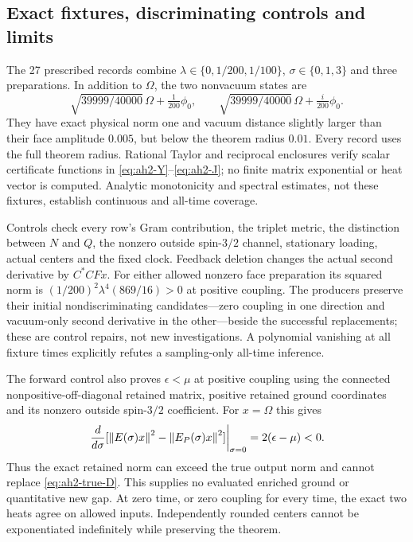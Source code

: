 \subsection{Exact fixtures, discriminating controls and limits}
The 27 prescribed records combine $\lambda\in\{0,1/200,1/100\}$, $\sigma\in\{0,1,3\}$ and three preparations. In addition to $\Omega$, the two nonvacuum states are
\begin{equation}
 \sqrt{39999/40000}\,\Omega+\tfrac1{200}\phi_0,
 \qquad
 \sqrt{39999/40000}\,\Omega+\tfrac{i}{200}\phi_0.
\end{equation}
They have exact physical norm one and vacuum distance slightly larger than their face amplitude $0.005$, but below the theorem radius $0.01$. Every record uses the full theorem radius. Rational Taylor and reciprocal enclosures verify scalar certificate functions in \eqref{eq:ah2-Y}--\eqref{eq:ah2-J}; no finite matrix exponential or heat vector is computed. Analytic monotonicity and spectral estimates, not these fixtures, establish continuous and all-time coverage.

Controls check every row's Gram contribution, the triplet metric, the distinction between $N$ and $Q$, the nonzero outside spin-$3/2$ channel, stationary loading, actual centers and the fixed clock. Feedback deletion changes the actual second derivative by $C^*CFx$. For either allowed nonzero face preparation its squared norm is $(1/200)^2\lambda^4(869/16)>0$ at positive coupling. The producers preserve their initial nondiscriminating candidates---zero coupling in one direction and vacuum-only second derivative in the other---beside the successful replacements; these are control repairs, not new investigations. A polynomial vanishing at all fixture times explicitly refutes a sampling-only all-time inference.

The forward control also proves $\epsilon<\mu$ at positive coupling using the connected nonpositive-off-diagonal retained matrix, positive retained ground coordinates and its nonzero outside spin-$3/2$ coefficient. For $x=\Omega$ this gives
\begin{equation}
 \left.\frac d{d\sigma}
 [\left\lVert E(\sigma)x\right\rVert^2-\left\lVert E_P(\sigma)x\right\rVert^2]\right|_{\sigma=0}
 =2(\epsilon-\mu)<0.
\end{equation}
Thus the exact retained norm can exceed the true output norm and cannot replace \eqref{eq:ah2-true-D}. This supplies no evaluated enriched ground or quantitative new gap. At zero time, or zero coupling for every time, the exact two heats agree on allowed inputs. Independently rounded centers cannot be exponentiated indefinitely while preserving the theorem.

